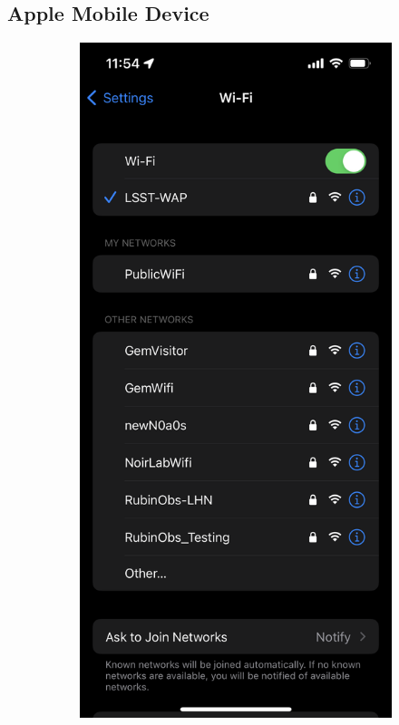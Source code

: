  \subsection{Apple Mobile Device}
  \vspace{20 mm}
  \begin{figure}
    \centering
    \begin{subfigure}{0.30\textwidth}
      \includegraphics[width=\textwidth]{Images/ios1.png}

\end{subfigure}
\end{figure}
